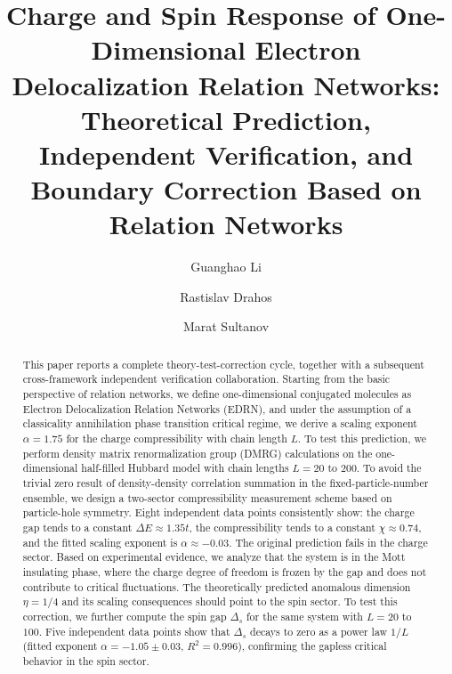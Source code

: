 \documentclass[prb,reprint,twocolumn,superscriptaddress]{revtex4-2}
\begin{document}
\title{Charge and Spin Response of One-Dimensional Electron Delocalization Relation Networks:
Theoretical Prediction, Independent Verification, and Boundary Correction Based on Relation Networks}

\author{Guanghao Li}
\author{Rastislav Drahos}
\author{Marat Sultanov}

\begin{abstract}
This paper reports a complete theory-test-correction cycle, together with a subsequent cross-framework independent verification collaboration. Starting from the basic perspective of relation networks, we define one-dimensional conjugated molecules as Electron Delocalization Relation Networks (EDRN), and under the assumption of a classicality annihilation phase transition critical regime, we derive a scaling exponent $\alpha = 1.75$ for the charge compressibility with chain length $L$. To test this prediction, we perform density matrix renormalization group (DMRG) calculations on the one-dimensional half-filled Hubbard model with chain lengths $L = 20$ to $200$. To avoid the trivial zero result of density-density correlation summation in the fixed-particle-number ensemble, we design a two-sector compressibility measurement scheme based on particle-hole symmetry. Eight independent data points consistently show: the charge gap tends to a constant $\Delta E \approx 1.35t$, the compressibility tends to a constant $\chi \approx 0.74$, and the fitted scaling exponent is $\alpha \approx -0.03$. The original prediction fails in the charge sector. Based on experimental evidence, we analyze that the system is in the Mott insulating phase, where the charge degree of freedom is frozen by the gap and does not contribute to critical fluctuations. The theoretically predicted anomalous dimension $\eta = 1/4$ and its scaling consequences should point to the spin sector. To test this correction, we further compute the spin gap $\Delta_s$ for the same system with $L = 20$ to $100$. Five independent data points show that $\Delta_s$ decays to zero as a power law $1/L$ (fitted exponent $\alpha = -1.05 \pm 0.03$, $R^2 = 0.996$), confirming the gapless critical behavior in the spin sector.


\end{abstract}
\end{document}
